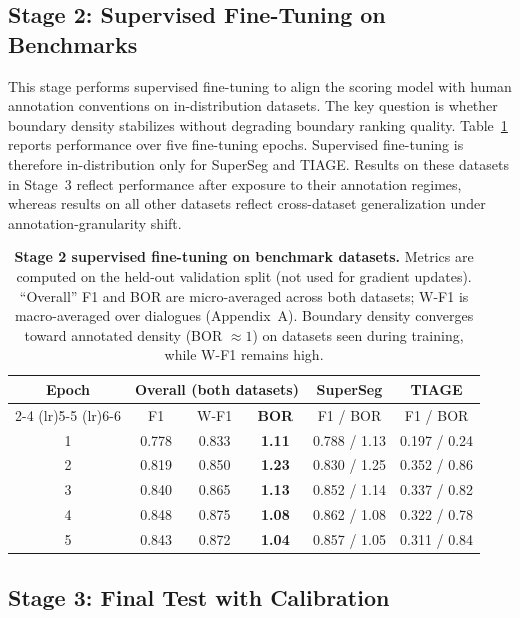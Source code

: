 \documentclass{article}
\begin{document}
\subsection{Stage 2: Supervised Fine-Tuning on Benchmarks}
This stage performs supervised fine-tuning to align the scoring model
with human annotation conventions on in-distribution datasets. The key
question is whether boundary density stabilizes without degrading
boundary ranking quality. Table~\ref{tab:stage2} reports performance
over five fine-tuning epochs. Supervised fine-tuning is therefore
in-distribution only for SuperSeg and TIAGE. Results on these datasets
in Stage~3 reflect performance after exposure to their annotation
regimes, whereas results on all other datasets reflect cross-dataset
generalization under annotation-granularity shift.

\begin{table}[t]
  \centering
  \begin{tabular}{c c c c c c}
    \toprule
    Epoch & \multicolumn{3}{c}{Overall (both datasets)} & SuperSeg & TIAGE \\
    \cmidrule(lr){2-4} \cmidrule(lr){5-5} \cmidrule(lr){6-6}
     & F1 & W-F1 & \textbf{BOR} & F1 / BOR & F1 / BOR \\
    \midrule
    1 & 0.778 & 0.833 & \textbf{1.11} & 0.788 / 1.13 & 0.197 / 0.24 \\
    2 & 0.819 & 0.850 & \textbf{1.23} & 0.830 / 1.25 & 0.352 / 0.86 \\
    3 & 0.840 & 0.865 & \textbf{1.13} & 0.852 / 1.14 & 0.337 / 0.82 \\
    4 & 0.848 & 0.875 & \textbf{1.08} & 0.862 / 1.08 & 0.322 / 0.78 \\
    5 & 0.843 & 0.872 & \textbf{1.04} & 0.857 / 1.05 & 0.311 / 0.84 \\
    \bottomrule
  \end{tabular}
  \caption{\textbf{Stage 2 supervised fine-tuning on benchmark datasets.}
    Metrics are computed on the held-out validation split (not used for gradient updates).
    ``Overall'' F1 and BOR are micro-averaged across both datasets;
    W-F1 is macro-averaged over dialogues (Appendix~A).
    Boundary density converges toward annotated density (BOR $\approx 1$)
    on datasets seen during training, while W-F1 remains high.}
  \label{tab:stage2}
\end{table}

\subsection{Stage 3: Final Test with Calibration}
\label{sec:stage3}
\end{document}
